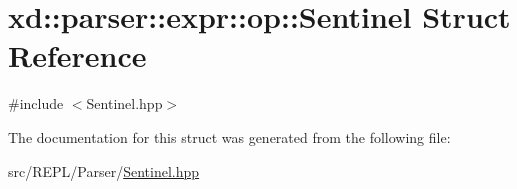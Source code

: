 \hypertarget{structxd_1_1parser_1_1expr_1_1op_1_1_sentinel}{}\section{xd\+:\+:parser\+:\+:expr\+:\+:op\+:\+:Sentinel Struct Reference}
\label{structxd_1_1parser_1_1expr_1_1op_1_1_sentinel}


{\ttfamily \#include $<$Sentinel.\+hpp$>$}



The documentation for this struct was generated from the following file\+:\begin{DoxyCompactItemize}
\item 
src/\+R\+E\+P\+L/\+Parser/\mbox{\hyperlink{_sentinel_8hpp}{Sentinel.\+hpp}}\end{DoxyCompactItemize}
